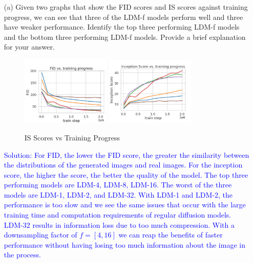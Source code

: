 \documentclass[a4paper]{article}
\begin{document}
\begin{itemize}
    \item [(a)]
    Given two graphs that show the FID scores and IS scores against training progress, we can see that three of the LDM-f models perform well and three have weaker performance. Identify the top three performing LDM-f models and the bottom three performing LDM-f models. Provide a brief explanation for your answer.

     \begin{figure}[htbp]
        \centering
        \includegraphics[width=0.4\textwidth]{fid_scores.png} \hfill
        \includegraphics[width=0.4\textwidth]{is_scores.png}
        \caption{IS Scores vs Training Progress}
        \label{fig:is}
    \end{figure}

     \textcolor{blue}{Solution: For FID, the lower the FID score, the greater the similarity between the distributions of the generated images and real images. For the inception score, the higher the score, the better the quality of the model. The top three performing models are LDM-4, LDM-8, LDM-16. The worst of the three models are LDM-1, LDM-2, and LDM-32. With LDM-1 and LDM-2, the performance is too slow and we see the same issues that occur with the large training time and computation requirements of regular diffusion models. LDM-32 results in information loss due to too much compression. With a downsampling factor of \(f = [4, 16]\) we can reap the benefits of faster performance without having losing too much information about the image in the process.}
     
     
\end{itemize}
\end{document}
